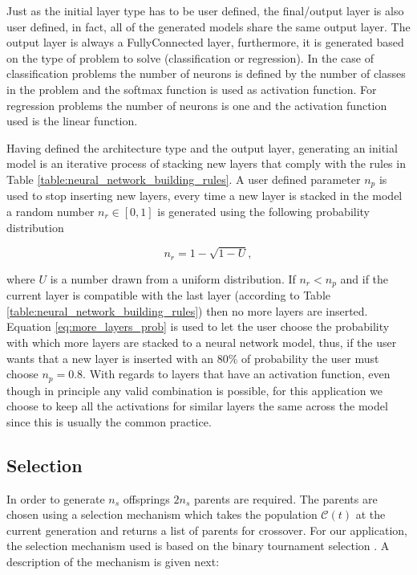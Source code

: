 \documentclass[journal]{IEEEtran}
\begin{document}
Just as the initial layer type has to be user defined, the final/output layer is also user defined, in fact, all of the generated models share the same output layer. The output layer is always a FullyConnected layer, furthermore, it is generated based on the type of problem to solve (classification or regression). In the case of classification problems the number of neurons is defined by the number of classes in the problem and the softmax function is used as activation function. For regression problems the number of neurons is one and the activation function used is the linear function.

Having defined the architecture type and the output layer, generating an initial model is an iterative process of stacking new layers that comply with the rules in Table \ref{table:neural_network_building_rules}. A user defined parameter $n_p$ is used to stop inserting new layers, every time a new layer is stacked in the model a random number $n_r \in \left[0,1\right]$ is generated using the following probability distribution

\begin{equation}
n_r = 1 - \sqrt{1 - U},
\label{eq:more_layers_prob}
\end{equation}

where $U$ is a number drawn from a uniform distribution. If $n_r < n_p$ and if the current layer is compatible with the last layer (according to Table \ref{table:neural_network_building_rules}) then no more layers are inserted. Equation \ref{eq:more_layers_prob} is used to let the user choose the probability with which more layers are stacked to a neural network model, thus, if the user wants that a new layer is inserted with an $80\%$ of probability the user must choose $n_p = 0.8$. With regards to layers that have an activation function, even though in principle any valid combination is possible, for this application we choose to keep all the activations for similar layers the same across the model since this is usually the common practice. 

\subsection{Selection}
\label{sec:selection}

In order to generate $n_s$ offsprings $2n_s$ parents are required. The parents are chosen using a selection mechanism which takes the population $\mathcal{C}(t)$ at the current generation and returns a list of parents for crossover. For our application, the selection mechanism used is based on the binary tournament selection \cite{Engelbrecht2007, Krishnakumar1989}. A description of the mechanism is given next: 
\end{document}
